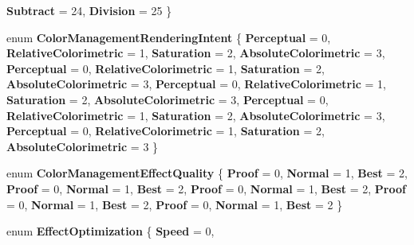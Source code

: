 \begin{DoxyCompactItemize}
\newline
{\bfseries Subtract} = 24, 
{\bfseries Division} = 25
 \}
\item 
\mbox{\label{namespace_microsoft_1_1_graphics_1_1_canvas_1_1_effects_a46519f571ff01b1f57ee3699fc97a7ce}} 
enum {\bfseries Color\+Management\+Rendering\+Intent} \{ \newline
{\bfseries Perceptual} = 0, 
{\bfseries Relative\+Colorimetric} = 1, 
{\bfseries Saturation} = 2, 
{\bfseries Absolute\+Colorimetric} = 3, 
\newline
{\bfseries Perceptual} = 0, 
{\bfseries Relative\+Colorimetric} = 1, 
{\bfseries Saturation} = 2, 
{\bfseries Absolute\+Colorimetric} = 3, 
\newline
{\bfseries Perceptual} = 0, 
{\bfseries Relative\+Colorimetric} = 1, 
{\bfseries Saturation} = 2, 
{\bfseries Absolute\+Colorimetric} = 3, 
\newline
{\bfseries Perceptual} = 0, 
{\bfseries Relative\+Colorimetric} = 1, 
{\bfseries Saturation} = 2, 
{\bfseries Absolute\+Colorimetric} = 3, 
\newline
{\bfseries Perceptual} = 0, 
{\bfseries Relative\+Colorimetric} = 1, 
{\bfseries Saturation} = 2, 
{\bfseries Absolute\+Colorimetric} = 3
 \}
\item 
\mbox{\label{namespace_microsoft_1_1_graphics_1_1_canvas_1_1_effects_a7a6e53eb824ad37f9b09d4149ae14d35}} 
enum {\bfseries Color\+Management\+Effect\+Quality} \{ \newline
{\bfseries Proof} = 0, 
{\bfseries Normal} = 1, 
{\bfseries Best} = 2, 
{\bfseries Proof} = 0, 
\newline
{\bfseries Normal} = 1, 
{\bfseries Best} = 2, 
{\bfseries Proof} = 0, 
{\bfseries Normal} = 1, 
\newline
{\bfseries Best} = 2, 
{\bfseries Proof} = 0, 
{\bfseries Normal} = 1, 
{\bfseries Best} = 2, 
\newline
{\bfseries Proof} = 0, 
{\bfseries Normal} = 1, 
{\bfseries Best} = 2
 \}
\item 
\mbox{\label{namespace_microsoft_1_1_graphics_1_1_canvas_1_1_effects_abe4426b8577454af68a566839afdea96}} 
enum {\bfseries Effect\+Optimization} \{ \newline
{\bfseries Speed} = 0, 

\end{DoxyCompactItemize}
